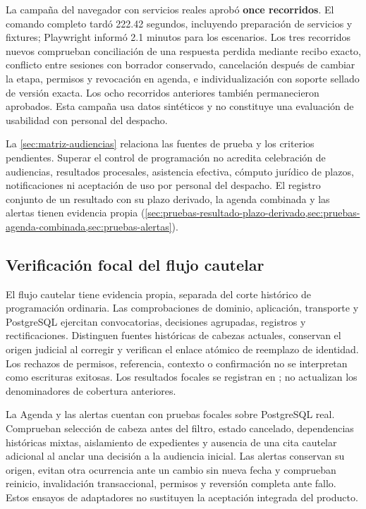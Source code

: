 La campaña del navegador con servicios reales aprobó \textbf{once recorridos}. El comando completo tardó 222.42 segundos, incluyendo preparación de servicios y fixtures; Playwright informó 2.1 minutos para los escenarios. Los tres recorridos nuevos comprueban conciliación de una respuesta perdida mediante recibo exacto, conflicto entre sesiones con borrador conservado, cancelación después de cambiar la etapa, permisos y revocación en agenda, e individualización con soporte sellado de versión exacta. Los ocho recorridos anteriores también permanecieron aprobados. Esta campaña usa datos sintéticos y no constituye una evaluación de usabilidad con personal del despacho.

La \cref{sec:matriz-audiencias} relaciona las fuentes de prueba y los criterios pendientes. Superar el control de programación no acredita celebración de audiencias, resultados procesales, asistencia efectiva, cómputo jurídico de plazos, notificaciones ni aceptación de uso por personal del despacho. El registro conjunto de un resultado con su plazo derivado, la agenda combinada y las alertas tienen evidencia propia (\cref{sec:pruebas-resultado-plazo-derivado,sec:pruebas-agenda-combinada,sec:pruebas-alertas}).


\subsection{Verificaci\'on focal del flujo cautelar}\label{sec:pruebas-cautelares}

El flujo cautelar tiene evidencia propia, separada del corte hist\'orico de programaci\'on ordinaria. Las comprobaciones de dominio, aplicaci\'on, transporte y PostgreSQL ejercitan convocatorias, decisiones agrupadas, registros y rectificaciones. Distinguen fuentes hist\'oricas de cabezas actuales, conservan el origen judicial al corregir y verifican el enlace at\'omico de reemplazo de identidad. Los rechazos de permisos, referencia, contexto o confirmaci\'on no se interpretan como escrituras exitosas. Los resultados focales se registran en ; no actualizan los denominadores de cobertura anteriores.

La Agenda y las alertas cuentan con pruebas focales sobre PostgreSQL real. Comprueban selecci\'on de cabeza antes del filtro, estado cancelado, dependencias hist\'oricas mixtas, aislamiento de expedientes y ausencia de una cita cautelar adicional al anclar una decisi\'on a la audiencia inicial. Las alertas conservan su origen, evitan otra ocurrencia ante un cambio sin nueva fecha y comprueban reinicio, invalidaci\'on transaccional, permisos y reversi\'on completa ante fallo. Estos ensayos de adaptadores no sustituyen la aceptaci\'on integrada del producto.

